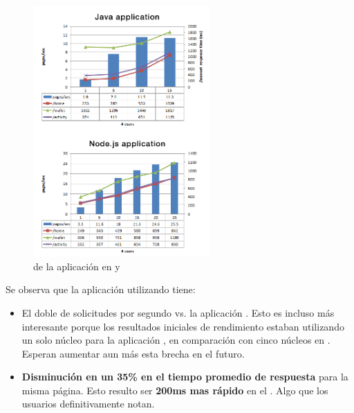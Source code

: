 \begin{figure}[H]
	\centering
	\includegraphics[width=0.6\textwidth]{figuras/cap2/java_nodejs_benchmark_paypal.png}
	\caption{\performanceQA de la aplicación en \javaNAME y \nodejsNAME}
	\label{figure:java_benchmark_paypal}
\end{figure}

Se observa que la aplicación utilizando \nodejsNAME tiene:

\begin{itemize}
\item El doble de solicitudes por segundo vs. la aplicación \javaNAME. Esto es incluso más interesante porque los resultados iniciales de rendimiento estaban utilizando un solo núcleo para la aplicación \nodejsNAME, en comparación con cinco núcleos en \javaNAME. Esperan aumentar aun más esta brecha en el futuro.
\item \textbf{Disminución en un 35\% en el tiempo promedio de respuesta} para la misma página. Esto resulto ser \textbf{200ms mas rápido} en el \serverAS. Algo que los usuarios definitivamente notan.
\end{itemize}

